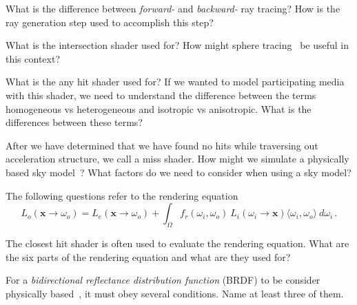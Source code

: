 \documentclass{exam}
\begin{document}
\begin{questions}


\question[10] What is the difference between \emph{forward-} and \emph{backward-} ray tracing? How is the ray generation step used to accomplish this step?

\answer %

\question[10] What is the intersection shader used for? How might sphere tracing~\cite{hart1996sphere} be useful in this context?

\answer %


\question[10] What is the any hit shader used for? If we wanted to model participating media~\cite{Jarosz:2008:RCP:1330511.1330518} with this shader, we need to understand the difference between the terms homogeneous vs heterogeneous and isotropic vs anisotropic. What is the differences between these terms?

\answer %


\question[10] After we have determined that we have found no hits while traversing out acceleration structure, we call a miss shader. How might we simulate a physically based sky model~\cite{Hosek:2012:AMF:2185520.2185591}? What factors do we need to consider when using a sky model?

\answer %


\vspace{2em}
The following questions refer to the rendering equation~\cite{Kajiya:1986:RE:15886.15902}
\begin{equation}
    L_o(\mathbf{x}\to\omega_o) = L_e(\mathbf{x}\to\omega_o) + \int_{\Omega} f_r(\omega_i, \omega_o)\ L_i(\omega_i\to\mathbf{x})\langle \omega_i, \omega_o \rangle\ d\omega_i \,.
\end{equation}

\question[10] The closest hit shader is often used to evaluate the rendering equation. What are the six parts of the rendering equation and what are they used for?

\answer %


\question[10] For a \emph{bidirectional reflectance distribution function} (BRDF) to be consider physically based~\cite{Heitz2014Microfacet}, it must obey several conditions. Name at least three of them.


\end{questions}
\end{document}
